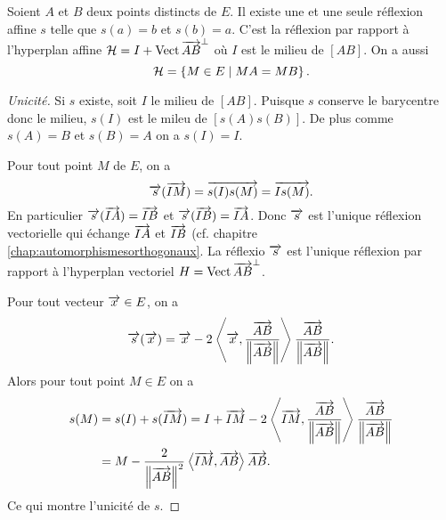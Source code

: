 \begin{prop}
  Soient $A$ et $B$ deux points distincts de $E$. Il existe une et une seule réflexion affine $s$ telle que $s(a)=b$ et $s(b)=a$. C'est la réflexion par rapport à l'hyperplan affine $\mathcal{H}=I +\operatorname{Vect}{\overrightarrow{AB}}^\perp$ où $I$ est le milieu de $[AB]$. On a aussi
  \begin{equation}
    \mathcal{H} = \left\{M \in E\mathrel{}\middle|\mathrel{}MA=MB\right\}.
  \end{equation}
\end{prop}
\begin{proof}[Unicité]
  Si $s$ existe, soit $I$ le milieu de $[AB]$. Puisque $s$ conserve le barycentre donc le milieu, $s(I)$ est le mileu de $[s(A)s(B)]$. De plus comme $s(A)=B$ et $s(B)=A$ on a $s(I)=I$. 

  Pour tout point $M$ de $E$, on a
  \begin{equation}
    \overrightarrow{s}(\overrightarrow{IM}) = \overrightarrow{s(I)s(M)} = \overrightarrow{Is(M)}.
  \end{equation}
  En particulier $\overrightarrow{s}(\overrightarrow{IA})=\overrightarrow{IB}$ et $\overrightarrow{s}(\overrightarrow{IB})=\overrightarrow{IA}$. Donc $\overrightarrow{s}$ est l'unique réflexion vectorielle qui échange $\overrightarrow{IA}$ et $\overrightarrow{IB}$ (cf. chapitre \ref{chap:automorphismesorthogonaux}. La réflexio $\overrightarrow{s}$ est l'unique réflexion par rapport à l'hyperplan vectoriel $H = \operatorname{Vect}{\overrightarrow{AB}}^\perp$.

  Pour tout vecteur $\overrightarrow{x} \in E$, on a
  \begin{equation}
    \overrightarrow{s}(\overrightarrow{x}) = \overrightarrow{x} - 2\left\langle{\overrightarrow{x}},{\frac{\overrightarrow{AB}}{\left\lVert\overrightarrow{AB}\right\rVert}}\right\rangle \frac{\overrightarrow{AB}}{\left\lVert\overrightarrow{AB}\right\rVert}.
  \end{equation}
  Alors pour tout point $M \in E$ on a
  \begin{align}
    s(M) &= s(I) + s(\overrightarrow{IM}) = I + \overrightarrow{IM} -2\left\langle{\overrightarrow{IM}},{\frac{\overrightarrow{AB}}{\left\lVert\overrightarrow{AB}\right\rVert}}\right\rangle \frac{\overrightarrow{AB}}{\left\lVert\overrightarrow{AB}\right\rVert} \\
        &=M -\frac{2}{\left\lVert\overrightarrow{AB}\right\rVert^2}\left\langle{\overrightarrow{IM}},{\overrightarrow{AB}}\right\rangle \overrightarrow{AB}.
  \end{align}
  Ce qui montre l'unicité de $s$.
\end{proof}
